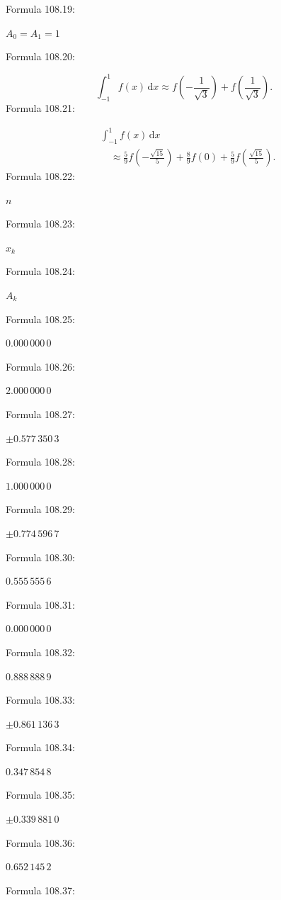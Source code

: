 \documentclass[11pt]{article}
\begin{document}
\noindent Formula 108.19:\par
$A_0=A_1=1$\par
\noindent Formula 108.20:\par
\[
\int_{-1}^{1}f(x)\,\mathrm{d}x\approx
f\left(-\frac1{\sqrt3}\right)+f\left(\frac1{\sqrt3}\right).
\]
\noindent Formula 108.21:\par
\[
\begin{aligned}
&\int_{-1}^{1}f(x)\,\mathrm{d}x\\
&\quad\approx\frac59f\left(-\frac{\sqrt{15}}5\right)
+\frac89f(0)+\frac59f\left(\frac{\sqrt{15}}5\right).
\end{aligned}
\]
\noindent Formula 108.22:\par
$n$\par
\noindent Formula 108.23:\par
$x_k$\par
\noindent Formula 108.24:\par
$A_k$\par
\noindent Formula 108.25:\par
$0.000\,000\,0$\par
\noindent Formula 108.26:\par
$2.000\,000\,0$\par
\noindent Formula 108.27:\par
$\pm0.577\,350\,3$\par
\noindent Formula 108.28:\par
$1.000\,000\,0$\par
\noindent Formula 108.29:\par
$\pm0.774\,596\,7$\par
\noindent Formula 108.30:\par
$0.555\,555\,6$\par
\noindent Formula 108.31:\par
$0.000\,000\,0$\par
\noindent Formula 108.32:\par
$0.888\,888\,9$\par
\noindent Formula 108.33:\par
$\pm0.861\,136\,3$\par
\noindent Formula 108.34:\par
$0.347\,854\,8$\par
\noindent Formula 108.35:\par
$\pm0.339\,881\,0$\par
\noindent Formula 108.36:\par
$0.652\,145\,2$\par
\noindent Formula 108.37:\par
\end{document}
